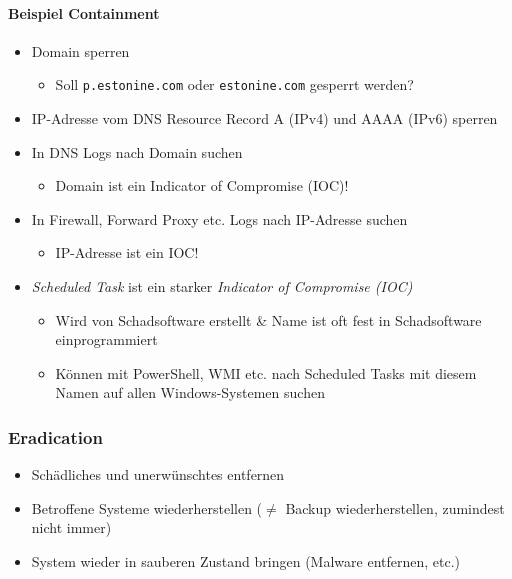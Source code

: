 \paragraph{Beispiel Containment}
\begin{itemize}
    \item Domain sperren
    \begin{itemize}
        \item Soll \lstinline|p.estonine.com| oder \lstinline|estonine.com| gesperrt werden?
    \end{itemize}
    \item IP-Adresse vom DNS Resource Record A (IPv4) und AAAA (IPv6) sperren
    \item In DNS Logs nach Domain suchen
    \begin{itemize}
        \item Domain ist ein Indicator of Compromise (IOC)!
    \end{itemize}
    \item In Firewall, Forward Proxy etc. Logs nach IP-Adresse suchen
    \begin{itemize}
        \item IP-Adresse ist ein IOC!
    \end{itemize}
    \item \textit{Scheduled Task} ist ein starker \textit{Indicator of Compromise (IOC)}
    \begin{itemize}
        \item Wird von Schadsoftware erstellt \& Name ist oft fest in Schadsoftware einprogrammiert
        \item Können mit PowerShell, WMI etc. nach Scheduled Tasks mit diesem Namen auf allen Windows-Systemen suchen
    \end{itemize}
\end{itemize}

\subsubsection{Eradication}
\begin{itemize}
    \item Schädliches und unerwünschtes entfernen
    \item Betroffene Systeme wiederherstellen ($\neq$ Backup wiederherstellen, zumindest nicht immer)
    \item System wieder in sauberen Zustand bringen (Malware entfernen, etc.)
\end{itemize}

